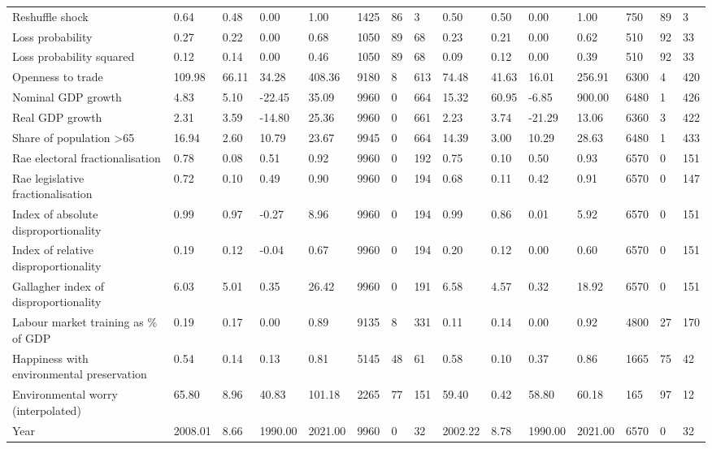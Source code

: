 \begin{longtable}{lllllllllllllll}
Reshuffle shock & 0.64 & 0.48 & 0.00 & 1.00 & 1425 & 86 & 3 & 0.50 & 0.50 & 0.00 & 1.00 & 750 & 89 & 3\\
Loss probability & 0.27 & 0.22 & 0.00 & 0.68 & 1050 & 89 & 68 & 0.23 & 0.21 & 0.00 & 0.62 & 510 & 92 & 33\\
\addlinespace
Loss probability squared & 0.12 & 0.14 & 0.00 & 0.46 & 1050 & 89 & 68 & 0.09 & 0.12 & 0.00 & 0.39 & 510 & 92 & 33\\
Openness to trade & 109.98 & 66.11 & 34.28 & 408.36 & 9180 & 8 & 613 & 74.48 & 41.63 & 16.01 & 256.91 & 6300 & 4 & 420\\
Nominal GDP growth & 4.83 & 5.10 & -22.45 & 35.09 & 9960 & 0 & 664 & 15.32 & 60.95 & -6.85 & 900.00 & 6480 & 1 & 426\\
Real GDP growth & 2.31 & 3.59 & -14.80 & 25.36 & 9960 & 0 & 661 & 2.23 & 3.74 & -21.29 & 13.06 & 6360 & 3 & 422\\
Share of population >65 & 16.94 & 2.60 & 10.79 & 23.67 & 9945 & 0 & 664 & 14.39 & 3.00 & 10.29 & 28.63 & 6480 & 1 & 433\\
\addlinespace
Rae electoral fractionalisation & 0.78 & 0.08 & 0.51 & 0.92 & 9960 & 0 & 192 & 0.75 & 0.10 & 0.50 & 0.93 & 6570 & 0 & 151\\
Rae legislative fractionalisation & 0.72 & 0.10 & 0.49 & 0.90 & 9960 & 0 & 194 & 0.68 & 0.11 & 0.42 & 0.91 & 6570 & 0 & 147\\
Index of absolute disproportionality & 0.99 & 0.97 & -0.27 & 8.96 & 9960 & 0 & 194 & 0.99 & 0.86 & 0.01 & 5.92 & 6570 & 0 & 151\\
Index of relative disproportionality & 0.19 & 0.12 & -0.04 & 0.67 & 9960 & 0 & 194 & 0.20 & 0.12 & 0.00 & 0.60 & 6570 & 0 & 151\\
Gallagher index of disproportionality & 6.03 & 5.01 & 0.35 & 26.42 & 9960 & 0 & 191 & 6.58 & 4.57 & 0.32 & 18.92 & 6570 & 0 & 151\\
\addlinespace
Labour market training as \% of GDP & 0.19 & 0.17 & 0.00 & 0.89 & 9135 & 8 & 331 & 0.11 & 0.14 & 0.00 & 0.92 & 4800 & 27 & 170\\
Happiness with environmental preservation & 0.54 & 0.14 & 0.13 & 0.81 & 5145 & 48 & 61 & 0.58 & 0.10 & 0.37 & 0.86 & 1665 & 75 & 42\\
Environmental worry (interpolated) & 65.80 & 8.96 & 40.83 & 101.18 & 2265 & 77 & 151 & 59.40 & 0.42 & 58.80 & 60.18 & 165 & 97 & 12\\
Year & 2008.01 & 8.66 & 1990.00 & 2021.00 & 9960 & 0 & 32 & 2002.22 & 8.78 & 1990.00 & 2021.00 & 6570 & 0 & 32\\
\bottomrule
\end{longtable}
